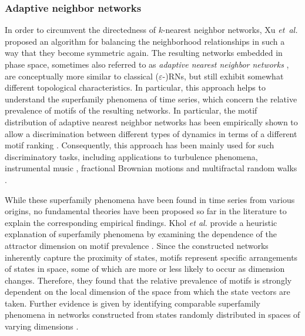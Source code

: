 		\subsubsection{Adaptive neighbor networks} \label{sec:adaptiveRN}
		In order to circumvent the directedness of $k$-nearest neighbor networks, Xu \textit{et~al.} \cite{Small2009,Xu2008} proposed an algorithm for balancing the neighborhood relationships in such a way that they become symmetric again. The resulting networks embedded in phase space, sometimes also referred to as \emph{adaptive nearest neighbor networks} \cite{Donner2011}, are conceptually more similar to classical ($\varepsilon$-)RNs, but still exhibit somewhat different topological characteristics. In particular, this approach helps to understand the superfamily phenomena of time series, which concern the relative prevalence of motifs of the resulting networks. In particular, the motif distribution of adaptive nearest neighbor networks has been empirically shown to allow a discrimination between different types of dynamics in terms of a different motif ranking \cite{Xu2008}. Consequently, this approach has been mainly used for such discriminatory tasks, including applications to turbulence phenomena, instrumental music \cite{Donner2011}, fractional Brownian motions and multifractal random walks \cite{Liu2010a}.

		While these superfamily phenomena have been found in time series from various origins, no fundamental theories have been proposed so far in the literature to explain the corresponding empirical findings. Khol {\textit{et al.}} provide a heuristic explanation of superfamily phenomena by examining the dependence of the attractor dimension on motif prevalence \cite{Khor2016}. Since the constructed networks inherently capture the proximity of states, motifs represent specific arrangements of states in space, some of which are more or less likely to occur as dimension changes. Therefore, they found that the relative prevalence of motifs is strongly dependent on the local dimension of the space from which the state vectors are taken. Further evidence is given by identifying comparable superfamily phenomena in networks constructed from states randomly distributed in spaces of varying dimensions \cite{Khor2016}.

